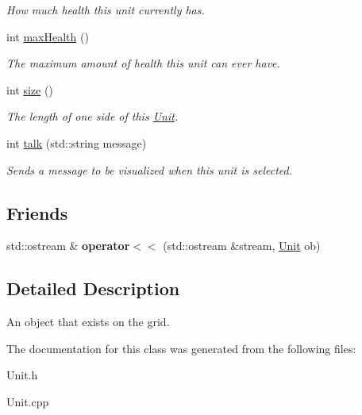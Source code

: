 \begin{DoxyCompactItemize}
\begin{DoxyCompactList}\small\item\em How much health this unit currently has. \item\end{DoxyCompactList}\item 
\hypertarget{classUnit_a418fab0ec29cd4a302b3e53c18ff2294}{
int \hyperlink{classUnit_a418fab0ec29cd4a302b3e53c18ff2294}{maxHealth} ()}
\label{classUnit_a418fab0ec29cd4a302b3e53c18ff2294}

\begin{DoxyCompactList}\small\item\em The maximum amount of health this unit can ever have. \item\end{DoxyCompactList}\item 
\hypertarget{classUnit_a869fad7cc1bdc6ea61b808bb168ddd8b}{
int \hyperlink{classUnit_a869fad7cc1bdc6ea61b808bb168ddd8b}{size} ()}
\label{classUnit_a869fad7cc1bdc6ea61b808bb168ddd8b}

\begin{DoxyCompactList}\small\item\em The length of one side of this \hyperlink{classUnit}{Unit}. \item\end{DoxyCompactList}\item 
\hypertarget{classUnit_a5aee9229edb0de2538fc7f1448de7655}{
int \hyperlink{classUnit_a5aee9229edb0de2538fc7f1448de7655}{talk} (std::string message)}
\label{classUnit_a5aee9229edb0de2538fc7f1448de7655}

\begin{DoxyCompactList}\small\item\em Sends a message to be visualized when this unit is selected. \item\end{DoxyCompactList}\end{DoxyCompactItemize}
\subsection*{Friends}
\begin{DoxyCompactItemize}
\item 
\hypertarget{classUnit_abba2ea3d62724066fa08ec7d9de7833a}{
std::ostream \& {\bfseries operator$<$$<$} (std::ostream \&stream, \hyperlink{classUnit}{Unit} ob)}
\label{classUnit_abba2ea3d62724066fa08ec7d9de7833a}

\end{DoxyCompactItemize}


\subsection{Detailed Description}
An object that exists on the grid. 

The documentation for this class was generated from the following files:\begin{DoxyCompactItemize}
\item 
Unit.h\item 
Unit.cpp\end{DoxyCompactItemize}
